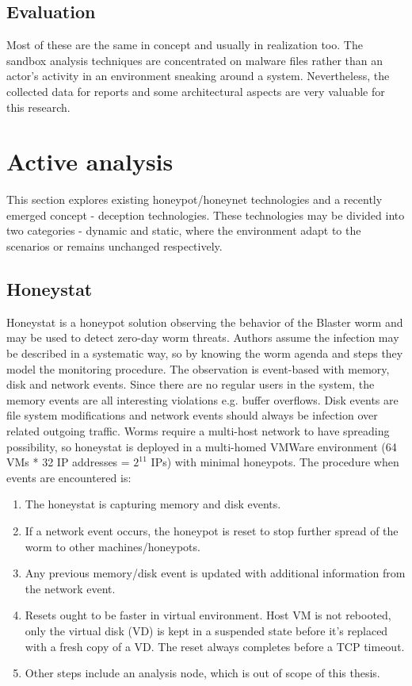 \subsection{Evaluation \label{related:malware-anal:eval}}
Most of these are the same in concept and usually in realization too. The sandbox analysis techniques are concentrated on malware files rather than an actor's activity in an environment sneaking around a system. Nevertheless, the collected data for reports and some architectural aspects are very valuable for this research.

\section{Active analysis \label{related:active-anal}}
This section explores existing honeypot/honeynet technologies and a recently emerged concept - deception technologies. These technologies may be divided into two categories - dynamic \cite{blog:dynamic-honeypot} and static, where the environment adapt to the scenarios or remains unchanged respectively.

\subsection{Honeystat \label{related:active-anal:honeystat}}
Honeystat\cite{paper:honeystat} is a honeypot solution observing the behavior of the Blaster worm and may be used to detect zero-day worm threats. Authors assume the infection may be described in a systematic way, so by knowing the worm agenda and steps they model the monitoring procedure. The observation is event-based with memory, disk and network events. Since there are no regular users in the system, the memory events are all interesting violations e.g. buffer overflows. Disk events are file system modifications and network events should always be infection over related outgoing traffic. Worms require a multi-host network to have spreading possibility, so honeystat is deployed in a multi-homed VMWare environment (64 VMs * 32 IP addresses = $2^{11}$ IPs) with minimal honeypots. The procedure when events are encountered is:

\begin{enumerate}[noitemsep]
	\item The honeystat is capturing memory and disk events.
	\item If a network event occurs, the honeypot is reset to stop further spread of the worm to other machines/honeypots.
	\item Any previous memory/disk event is updated with additional information from the network event.
	\item Resets ought to be faster in virtual environment. Host VM is not rebooted, only the virtual disk (VD) is kept in a suspended state before it's replaced with a fresh copy of a VD. The reset always completes before a TCP timeout.
	\item Other steps include an analysis node, which is out of scope of this thesis.
\end{enumerate}


